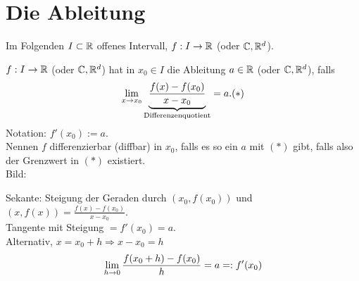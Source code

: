 \documentclass[../ana1.tex]{subfiles}
\begin{document}
\setcounter{section}{17}
\section{Die Ableitung}

Im Folgenden \( I \subset \mathbb{R} \) offenes Intervall, 
\( f: I \rightarrow \mathbb{R} \) (oder \( \mathbb{C} , \mathbb{R}^d \)).

\begin{defi}[Ableitung]
    \( f : I \rightarrow \mathbb{R} \) (oder \( \mathbb{C} , \mathbb{R}^d \)) 
    hat in \( x_0 \in I \) die Ableitung \( a\in \mathbb{R} \) 
    (oder \( \mathbb{C} , \mathbb{R}^d \)), falls 
    \[ \lim\limits_{x\rightarrow x_0} \underbrace{\frac{f(x) - f(x_0)}{x - x_0}}_{
        \text{Differenzenquotient}
    } = a. (*) \]
    Notation: \( f'(x_0) := a \).\\
    Nennen \(f\) differenzierbar (diffbar) in \(x_0\), falls 
    es so ein \(a\) mit \((*)\) gibt, falls also der Grenzwert 
    in \((*)\) existiert.\\
    Bild:
    \begin{center}
    \end{center}
    Sekante: Steigung der Geraden durch \( (x_0, f(x_0)) \) und 
    \((x, f(x)) = \frac{f(x) - f(x_0)}{x - x_0}\).\\
    Tangente mit Steigung \( = f'(x_0) = a \).\\
    Alternativ, \( x = x_0 + h \Rightarrow x - x_0 = h \)
    \[ \lim\limits_{h\rightarrow 0} \frac{f(x_0 + h) - f(x_0)}{h} = a =: f'(x_0) \]
\end{defi}
\end{document}
